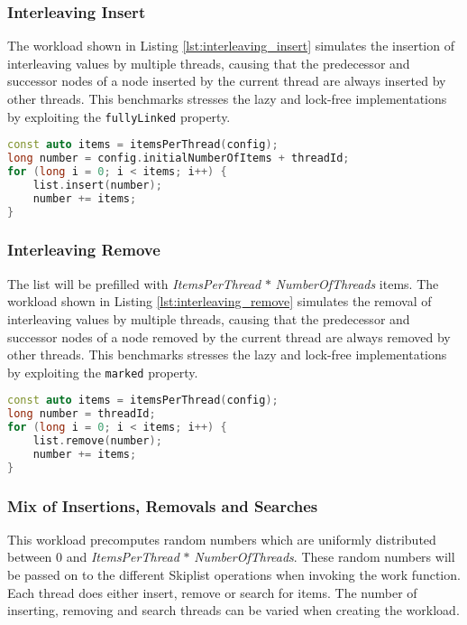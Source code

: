 \subsubsection{Interleaving Insert}

The workload shown in Listing \ref{lst:interleaving_insert} simulates the insertion of interleaving values by multiple threads, causing that the predecessor and successor nodes of a node inserted by the current thread are always inserted by other threads. This benchmarks stresses the lazy and lock-free implementations by exploiting the \texttt{fullyLinked} property. 

\begin{lstlisting}[language=C++, caption={Interleaving Insert Workload}, label=lst:interleaving_insert]
const auto items = itemsPerThread(config);
long number = config.initialNumberOfItems + threadId;
for (long i = 0; i < items; i++) {
    list.insert(number);
    number += items;
}
\end{lstlisting}


\subsubsection{Interleaving Remove}

The list will be prefilled with \textit{ItemsPerThread} $*$ \textit{NumberOfThreads} items. The workload shown in Listing \ref{lst:interleaving_remove} simulates the removal of interleaving values by multiple threads, causing that the predecessor and successor nodes of a node removed by the current thread are always removed by other threads. This benchmarks stresses the lazy and lock-free implementations by exploiting the \texttt{marked} property. 

\begin{lstlisting}[language=C++, caption={Interleaving Remove Workload}, label=lst:interleaving_remove]
const auto items = itemsPerThread(config);
long number = threadId;
for (long i = 0; i < items; i++) {
    list.remove(number);
    number += items;
}
\end{lstlisting}


\subsubsection{Mix of Insertions, Removals and Searches}

This workload precomputes random numbers which are uniformly distributed between $0$ and \textit{ItemsPerThread} $*$ \textit{NumberOfThreads}. These random numbers will be passed on to the different Skiplist operations when invoking the work function. Each thread does either insert, remove or search for items. The number of inserting, removing and search threads can be varied when creating the workload.


